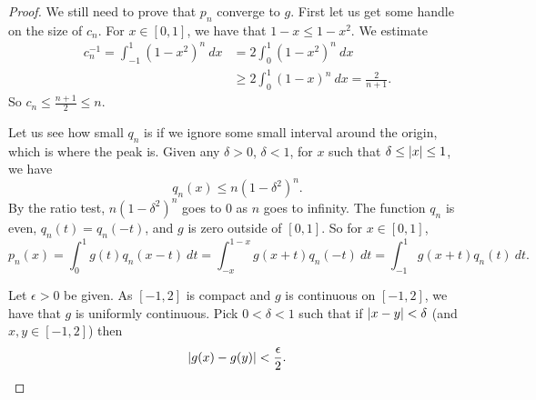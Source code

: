 \begin{proof}
We still need to prove that $p_n$ converge to $g$.  First let us
get some handle on the size of $c_n$.
%
For $x \in [0,1]$, we have that $1-x \leq 1-x^2$.  We estimate
\begin{equation*}
\begin{split}
c_n^{-1}   = \int_{-1}^1 {(1-x^2)}^n ~ dx
& = 2\int_0^1 {(1-x^2)}^n ~ dx \\
& \geq 2\int_0^{1} {(1-x)}^n ~ dx
= \frac{2}{n+1} .
\end{split}
\end{equation*}
So $c_n \leq \frac{n+1}{2} \leq n$.

Let us see how small $q_n$ is if we ignore some small interval around the origin,
which is where the peak is.
Given any $\delta > 0$, $\delta < 1$, for
$x$ such that $\delta \leq \lvert {x} \rvert \leq 1$, we have
\begin{equation*}
q_n(x) \leq n{(1-\delta^2)}^n .
\end{equation*}
By the ratio test, 
$n{(1-\delta^2)}^n$ goes to 0 as $n$ goes to infinity.
The function $q_n$ is even, $q_n(t) = q_n(-t)$, and $g$
is zero outside of $[0,1]$.
So for $x \in [0,1]$,
\begin{equation*}
p_n(x) = 
\int_{0}^1 g(t)q_n(x-t)  ~ dt
=
\int_{-x}^{1-x} g(x+t)q_n(-t)  ~ dt
=
\int_{-1}^{1} g(x+t)q_n(t)  ~ dt .
\end{equation*}

Let $\epsilon > 0$ be given.
As $[-1,2]$ is compact and $g$ is continuous on $[-1,2]$, we have that $g$ is uniformly continuous.
Pick $0 < \delta < 1$ such that if
$\lvert {x-y} \rvert < \delta$ (and $x,y \in [-1,2]$) then
\begin{equation*}
\lvert {g(x)-g(y)} \rvert < \frac{\epsilon}{2} .
\end{equation*}


\end{proof}
